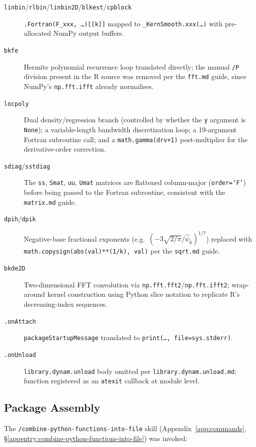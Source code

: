 \documentclass[12pt,a4paper]{article}
\begin{document}
\begin{description}
  \item[\texttt{linbin}/\texttt{rlbin}/\texttt{linbin2D}/\texttt{blkest}/\texttt{cpblock}]
    \texttt{.Fortran(F\_xxx,~\ldots)[[k]]} mapped to \texttt{\_KernSmooth.xxx(\ldots)} with pre-allocated NumPy output buffers.
  \item[\texttt{bkfe}]
    Hermite polynomial recurrence loop translated directly; the manual \texttt{/P} division present in the R source was removed per the \texttt{fft.md} guide, since NumPy's \texttt{np.fft.ifft} already normalises.
  \item[\texttt{locpoly}]
    Dual density/regression branch (controlled by whether the \texttt{y} argument is \texttt{None}); a variable-length bandwidth discretization loop; a 19-argument Fortran subroutine call; and a \texttt{math.gamma(drv+1)} post-multiplier for the derivative-order correction.
  \item[\texttt{sdiag}/\texttt{sstdiag}]
    The \texttt{ss}, \texttt{Smat}, \texttt{uu}, \texttt{Umat} matrices are flattened column-major (\texttt{order=`F'}) before being passed to the Fortran subroutine, consistent with the \texttt{matrix.md} guide.
  \item[\texttt{dpih}/\texttt{dpik}]
    Negative-base fractional exponents (e.g.\ $(-3\sqrt{2/\pi}/\hat\psi_6)^{1/7}$) replaced with \texttt{math.copysign(abs(val)**(1/k), val)} per the \texttt{sqrt.md} guide.
  \item[\texttt{bkde2D}]
    Two-dimensional FFT convolution via \texttt{np.fft.fft2}/\texttt{np.fft.ifft2}; wrap-around kernel construction using Python slice notation to replicate R's decreasing-index sequences.
  \item[\texttt{.onAttach}]
    \texttt{packageStartupMessage} translated to \texttt{print(\ldots,\,file=sys.stderr)}.
  \item[\texttt{.onUnload}]
    \texttt{library.dynam.unload} body omitted per \texttt{library.dynam.unload.md}; function registered as an \texttt{atexit} callback at module level.
\end{description}

\subsection{Package Assembly}

The \texttt{/combine-python-functions-into-file} skill (Appendix~\ref{app:commands}, \S\ref{appentry:combine-python-functions-into-file}) was invoked:
\end{document}
